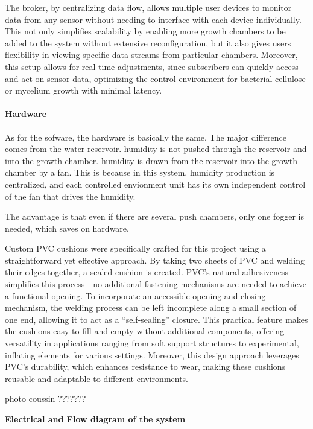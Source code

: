 The broker, by centralizing data flow, allows multiple user devices to monitor data from any sensor without needing to interface with each device individually. This not only simplifies scalability by enabling more growth chambers to be added to the system without extensive reconfiguration, but it also gives users flexibility in viewing specific data streams from particular chambers. Moreover, this setup allows for real-time adjustments, since subscribers can quickly access and act on sensor data, optimizing the control environment for bacterial cellulose or mycelium growth with minimal latency.

\paragraph{Hardware}

As for the sofware, the hardware is basically the same. The major difference comes from the water reservoir. humidity is not pushed through the reservoir and into the growth chamber. humidity is drawn from the reservoir into the growth chamber by a fan. 
This is because in this system, humidity production is centralized, and each controlled envionment unit has its own independent control of the fan that drives the humidity.

The advantage is that even if there are several push chambers, only one fogger is needed, which saves on hardware.

Custom PVC cushions were specifically crafted for this project using a straightforward yet effective approach. By taking two sheets of PVC and welding their edges together, a sealed cushion is created. PVC’s natural adhesiveness simplifies this process—no additional fastening mechanisms are needed to achieve a functional opening.
To incorporate an accessible opening and closing mechanism, the welding process can be left incomplete along a small section of one end, allowing it to act as a “self-sealing” closure. This practical feature makes the cushions easy to fill and empty without additional components, offering versatility in applications ranging from soft support structures to experimental, inflating elements for various settings. Moreover, this design approach leverages PVC’s durability, which enhances resistance to wear, making these cushions reusable and adaptable to different environments.

photo coussin ???????

\textbf{Electrical and Flow diagram of the system}


